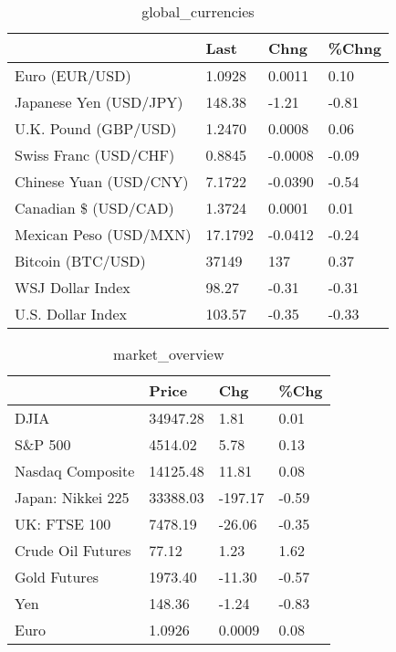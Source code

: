 \documentclass{article}%
\begin{document}
%


\begin{table}[htbp]%
\caption{global\_currencies}%
\centering%
\begin{adjustbox}{width=1\textwidth}%
\begin{tabular}{llll}
\toprule
                       &    Last &    Chng & \%Chng \\
\midrule
        Euro (EUR/USD) &  1.0928 &  0.0011 &  0.10 \\
Japanese Yen (USD/JPY) &  148.38 &   -1.21 & -0.81 \\
  U.K. Pound (GBP/USD) &  1.2470 &  0.0008 &  0.06 \\
 Swiss Franc (USD/CHF) &  0.8845 & -0.0008 & -0.09 \\
Chinese Yuan (USD/CNY) &  7.1722 & -0.0390 & -0.54 \\
  Canadian \$ (USD/CAD) &  1.3724 &  0.0001 &  0.01 \\
Mexican Peso (USD/MXN) & 17.1792 & -0.0412 & -0.24 \\
     Bitcoin (BTC/USD) &   37149 &     137 &  0.37 \\
      WSJ Dollar Index &   98.27 &   -0.31 & -0.31 \\
     U.S. Dollar Index &  103.57 &   -0.35 & -0.33 \\
\bottomrule
\end{tabular}
%
\end{adjustbox}%
\end{table}

%


\begin{table}[htbp]%
\caption{market\_overview}%
\centering%
\begin{adjustbox}{width=1\textwidth}%
\begin{tabular}{llll}
\toprule
                  &    Price &     Chg &  \%Chg \\
\midrule
             DJIA & 34947.28 &    1.81 &  0.01 \\
          S\&P 500 &  4514.02 &    5.78 &  0.13 \\
 Nasdaq Composite & 14125.48 &   11.81 &  0.08 \\
Japan: Nikkei 225 & 33388.03 & -197.17 & -0.59 \\
     UK: FTSE 100 &  7478.19 &  -26.06 & -0.35 \\
Crude Oil Futures &    77.12 &    1.23 &  1.62 \\
     Gold Futures &  1973.40 &  -11.30 & -0.57 \\
              Yen &   148.36 &   -1.24 & -0.83 \\
             Euro &   1.0926 &  0.0009 &  0.08 \\
\bottomrule
\end{tabular}
%
\end{adjustbox}%
\end{table}

%
\end{document}
